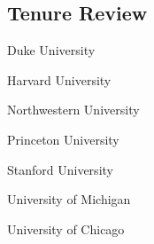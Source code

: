 \documentclass[11pt,letterpaper]{report}
\newcommand{\listitemspace}{0.25em}
\renewenvironment{itemize}
{\begin{list}{}{\setlength{\leftmargin}{0em}
                \setlength{\parskip}{0em}
                \setlength{\itemsep}{\listitemspace}
                \setlength{\parsep}{\listitemspace}}}
{\end{list}}
\begin{document}
    \subsection*{Tenure Review}

    \begin{itemize}

        \item Duke University
        \item Harvard University
        \item Northwestern University
        \item Princeton University
        \item Stanford University
        \item University of Michigan
        \item University of Chicago
        
    \end{itemize}
    






\end{document}
